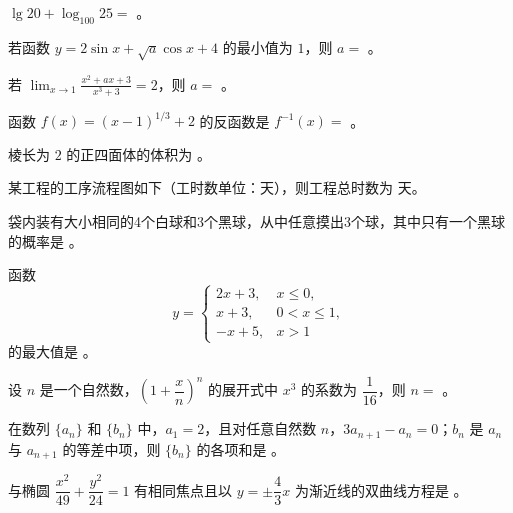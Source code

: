 \begin{question}
$\lg 20+\log_{100}25=$ \gkblank{}。

\end{question}
\begin{question}
若函数 $y=2\sin x+\sqrt a\cos x+4$ 的最小值为 $1$，则 $a=$ \gkblank{}。

\end{question}
\begin{question}
若 $\displaystyle\lim_{x\to1}\frac{x^2+ax+3}{x^3+3}=2$，则 $a=$ \gkblank{}。

\end{question}
\begin{question}
函数 $f(x)=(x-1)^{1/3}+2$ 的反函数是 $f^{-1}(x)=$ \gkblank{}。

\end{question}
\begin{question}
棱长为 $2$ 的正四面体的体积为 \gkblank{}。

\Needspace{0.4\textheight}
\end{question}
\begin{question}
某工程的工序流程图如下（工时数单位：天），则工程总时数为 \gkblank{} 天。
\nopagebreak[4]
\begin{center}\end{center}
\nopagebreak[4]
\end{question}
\begin{question}
袋内装有大小相同的4个白球和3个黑球，从中任意摸出3个球，其中只有一个黑球的概率是 \gkblank{}。

\end{question}
\begin{question}
函数
\nopagebreak[4]
\[
y=\begin{cases}
2x+3,&x\le 0,\\
x+3,&0<x\le1,\\
-x+5,&x>1
\end{cases}
\]
的最大值是 \gkblank{}。

\end{question}
\begin{question}
设 $n$ 是一个自然数，$\left(1+\dfrac{x}{n}\right)^n$ 的展开式中 $x^3$ 的系数为 $\dfrac1{16}$，则 $n=$ \gkblank{}。

\end{question}
\begin{question}
在数列 $\{a_n\}$ 和 $\{b_n\}$ 中，$a_1=2$，且对任意自然数 $n$，$3a_{n+1}-a_n=0$；$b_n$ 是 $a_n$ 与 $a_{n+1}$ 的等差中项，则 $\{b_n\}$ 的各项和是 \gkblank{}。

\end{question}
\begin{question}
与椭圆 $\dfrac{x^2}{49}+\dfrac{y^2}{24}=1$ 有相同焦点且以 $y=\pm\dfrac43x$ 为渐近线的双曲线方程是 \gkblank{}。

\end{question}

